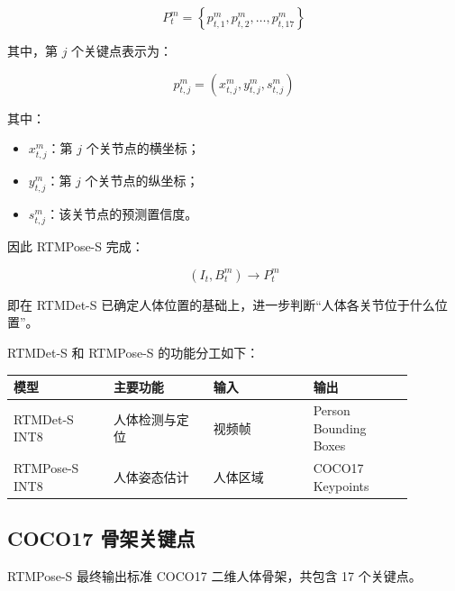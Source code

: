 \[
P_t^m=
\left\{
p_{t,1}^m,
p_{t,2}^m,
\ldots,
p_{t,17}^m
\right\}
\]

其中，第 \(j\) 个关键点表示为：

\[
p_{t,j}^m=
(x_{t,j}^m,y_{t,j}^m,s_{t,j}^m)
\]

其中：

\begin{itemize}
\item \(x_{t,j}^m\)：第 \(j\) 个关节点的横坐标；
\item \(y_{t,j}^m\)：第 \(j\) 个关节点的纵坐标；
\item \(s_{t,j}^m\)：该关节点的预测置信度。
\end{itemize}

因此 RTMPose-S 完成：

\[
\boxed{
(I_t,B_t^m)
\rightarrow
P_t^m
}
\]

即在 RTMDet-S 已确定人体位置的基础上，进一步判断“人体各关节位于什么位置”。

RTMDet-S 和 RTMPose-S 的功能分工如下：

\begin{center}
\small
\begin{longtable}{|>{\raggedright\arraybackslash}p{0.22\linewidth}|>{\raggedright\arraybackslash}p{0.22\linewidth}|>{\raggedright\arraybackslash}p{0.22\linewidth}|>{\raggedright\arraybackslash}p{0.22\linewidth}|}
\hline
模型 & 主要功能 & 输入 & 输出 \\
\hline
RTMDet-S INT8 & 人体检测与定位 & 视频帧 & Person Bounding Boxes \\
\hline
RTMPose-S INT8 & 人体姿态估计 & 人体区域 & COCO17 Keypoints \\
\hline
\end{longtable}
\end{center}

\subsection{COCO17 骨架关键点}

RTMPose-S 最终输出标准 COCO17 二维人体骨架，共包含 17 个关键点。

